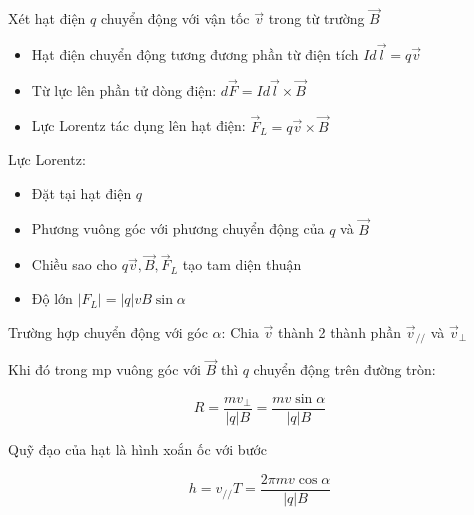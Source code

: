 Xét hạt điện $q$ chuyển động với vận tốc $\vec{v}$ trong từ trường $\vec{B}$

\begin{itemize}
  \item Hạt điện chuyển động tương đương phần từ điện tích $Id\vec{l} = q\vec{v}$
  \item Từ lực lên phần tử dòng điện: $d\vec{F} = Id\vec{l} \times \vec{B}$
  \item Lực Lorentz tác dụng lên hạt điện: $\vec{F}_L = q\vec{v} \times \vec{B}$
\end{itemize}

Lực Lorentz: 

\begin{itemize}
  \item Đặt tại hạt điện $q$
  \item Phương vuông góc với phương chuyển động của $q$ và $\vec{B}$
  \item Chiều sao cho $q\vec{v}, \vec{B}, \vec{F}_L$ tạo tam diện thuận
  \item Độ lớn $|F_L| = |q|vB\sin\alpha$
\end{itemize}

Trường hợp chuyển động với góc $\alpha$: Chia $\vec{v}$ thành 2 thành phần $\vec{v}_{//}$ và $\vec{v}_{\perp}$

Khi đó trong mp vuông góc với $\vec{B}$ thì $q$ chuyển động trên đường tròn:

\begin{equation*}
  R = \frac{mv_{\perp}}{|q|B} = \frac{mv\sin\alpha}{|q|B}
\end{equation*}

Quỹ đạo của hạt là hình xoắn ốc với bước

\begin{equation*}
  h = v_{//}T = \frac{2\pi mv\cos\alpha}{|q|B}
\end{equation*}